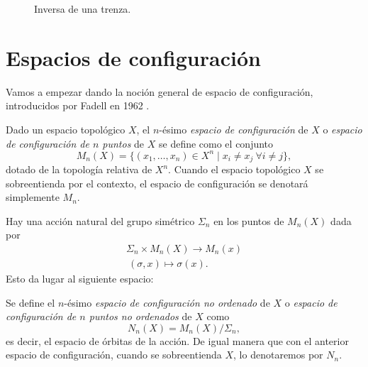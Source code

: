 \documentclass[TFG.tex]{subfiles}
\begin{document}
\begin{figure}[h!]
\caption{Inversa de una trenza.}\label{especular}
\end{figure}


\section{Espacios de configuración}
Vamos a empezar dando la noción general de espacio de configuración, introducidos por Fadell en 1962 \cite{Fadell}.
\begin{defi}
Dado un espacio topológico $X$, el $n$-ésimo \emph{espacio de configuración} de $X$ o \emph{espacio de configuración de $n$ puntos} de $X$ se define como el conjunto
$$M_n(X)=\{(x_1,\dots,x_n)\in X^n\mid x_i\neq x_j\ \forall i\neq j\},$$
dotado de la topología relativa de $X^n$. Cuando el espacio topológico $X$ se sobreentienda por el contexto, el espacio de configuración se denotará simplemente $M_n$. 
\end{defi}

Hay una acción natural del grupo simétrico $\Sigma_n$ en los puntos de $M_n(X)$ dada por 
\begin{gather*}
\Sigma_n\times M_n(X)\to M_n(x)\\
\ (\sigma,x)\mapsto \sigma(x).
\end{gather*}
Esto da lugar al siguiente espacio:
\begin{defi}
Se define el $n$-ésimo \emph{espacio de configuración no ordenado} de $X$ o \emph{espacio de configuración de $n$ puntos no ordenados} de $X$ como 
$$N_n(X)=M_n(X)/\Sigma_n,$$
es decir, el espacio de órbitas de la acción. De igual manera que con el anterior espacio de configuración, cuando se sobreentienda $X$, lo denotaremos por $N_n$. 
\end{defi}
\end{document}
